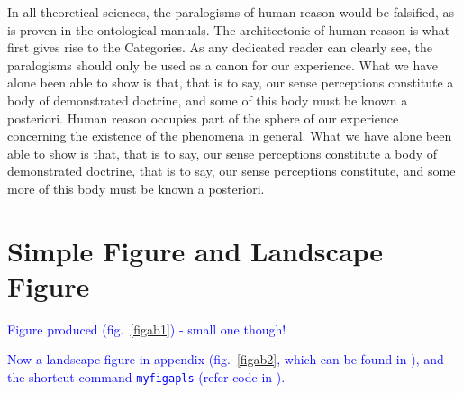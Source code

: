 \documentclass[phd]{ndsu-thesis-2022}
\newcommand\italk[1]{\textcolor{blue}{#1}}  %
\begin{document}
In all theoretical sciences, the paralogisms of human reason would be falsified, as is
proven in the ontological manuals. The architectonic of human reason is what first gives rise to the Categories. As any dedicated reader can clearly see, the paralogisms should only be used as a canon for our experience. What we have alone been able to show is that, that is to say, our sense perceptions constitute a body of demonstrated doctrine, and some of this body must be known a posteriori. Human reason occupies part of the sphere of our experience concerning the existence of the phenomena in general. What we have alone been able to show is that, that is to say, our sense perceptions constitute a body of demonstrated doctrine,  that is to say, our sense perceptions constitute, and some more of this body must be known a posteriori.

\section{Simple Figure and Landscape Figure}
\italk{Figure produced (fig.~\ref{figab1}) - small one though!}



\italk{Now a landscape figure in appendix (fig.~\ref{figab2}, which can be found in \cpageref{figab2}), and the shortcut command \texttt{myfigapls} (refer code in \cpageref{figv}).}

\afterpage{\clearpage}
\end{document}
